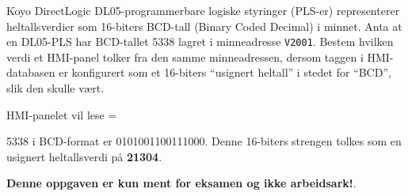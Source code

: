 

Koyo DirectLogic DL05-programmerbare logiske styringer (PLS-er) representerer heltallsverdier som 16-biters BCD-tall (Binary Coded Decimal) i minnet. Anta at en DL05-PLS har BCD-tallet 5338 lagret i minneadresse {\tt V2001}. Bestem hvilken verdi et HMI-panel tolker fra den samme minneadressen, dersom taggen i HMI-databasen er konfigurert som et 16-biters ``usignert heltall'' i stedet for ``BCD'', slik den skulle vært.

\vskip 10pt

HMI-panelet vil lese = \underbar{\hskip 50pt}







5338 i BCD-format er 0101001100111000. Denne 16-biters strengen tolkes som en usignert heltallsverdi på {\bf 21304}.







{\bf Denne oppgaven er kun ment for eksamen og ikke arbeidsark!}.

